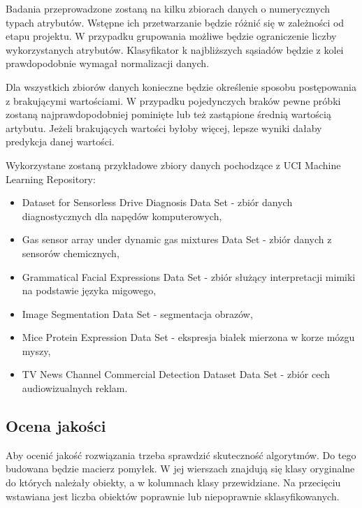 \documentclass[11pt,a4paper,twoside]{article}
\begin{document}
Badania przeprowadzone zostaną na kilku zbiorach danych o numerycznych typach atrybutów. Wstępne ich przetwarzanie będzie różnić się w zależności od etapu projektu. W przypadku grupowania możliwe będzie ograniczenie liczby wykorzystanych atrybutów. Klasyfikator k najbliższych sąsiadów będzie z kolei prawdopodobnie wymagał normalizacji danych. 

Dla wszystkich zbiorów danych konieczne będzie określenie sposobu postępowania z brakującymi wartościami. W przypadku pojedynczych braków pewne próbki zostaną najprawdopodobniej pominięte lub też zastąpione średnią wartością artybutu. Jeżeli brakujących wartości byłoby więcej, lepsze wyniki dałaby predykcja danej wartości.

Wykorzystane zostaną przykładowe zbiory danych pochodzące z UCI Machine Learning Repository:
\begin{itemize}
  \item Dataset for Sensorless Drive Diagnosis Data Set - zbiór danych diagnostycznych dla napędów komputerowych,
  \item Gas sensor array under dynamic gas mixtures Data Set - zbiór danych z sensorów chemicznych,
  \item Grammatical Facial Expressions Data Set - zbiór służący interpretacji mimiki na podstawie języka migowego,
  \item Image Segmentation Data Set - segmentacja obrazów,
  \item Mice Protein Expression Data Set - ekspresja białek mierzona w korze mózgu myszy,
  \item TV News Channel Commercial Detection Dataset Data Set - zbiór cech audiowizualnych reklam.
\end{itemize}

\subsection{Ocena jakości}
Aby ocenić jakość rozwiązania trzeba sprawdzić skuteczność algorytmów. Do tego budowana będzie macierz pomyłek. W jej wierszach znajdują się klasy oryginalne do których należały obiekty, a w kolumnach klasy przewidziane. Na przecięciu wstawiana jest liczba obiektów poprawnie lub niepoprawnie sklasyfikowanych. 
\end{document}
